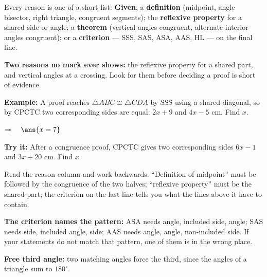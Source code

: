 \documentclass[12pt]{article}
\begin{document}


\begin{formulabox}
Every reason is one of a short list: \textbf{Given}; a \textbf{definition} (midpoint, angle bisector, right triangle, congruent segments); the \textbf{reflexive property} for a shared side or angle; a \textbf{theorem} (vertical angles congruent, alternate interior angles congruent); or a \textbf{criterion} --- SSS, SAS, ASA, AAS, HL --- on the final line.\par
\textbf{Two reasons no mark ever shows:} the reflexive property for a shared part, and vertical angles at a crossing. Look for them before deciding a proof is short of evidence.
\end{formulabox}

\begin{examplebox}
\textbf{Example:} \quad A proof reaches $\triangle ABC \cong \triangle CDA$ by SSS using a shared diagonal, so by CPCTC two corresponding sides are equal: $2x + 9$ and $4x - 5$ cm. Find $x$.

$\Rightarrow\quad \ans{x = 7}$
\end{examplebox}

\begin{tryitbox}
\textbf{Try it:} \quad After a congruence proof, CPCTC gives two corresponding sides $6x - 1$ and $3x + 20$ cm. Find $x$.\\[2pt]
\end{tryitbox}


\begin{formulabox}
Read the reason column and work backwards. ``Definition of midpoint'' must be followed by the congruence of the two halves; ``reflexive property'' must be the shared part; the criterion on the last line tells you what the lines above it have to contain.\par
\textbf{The criterion names the pattern:} ASA needs angle, included side, angle; SAS needs side, included angle, side; AAS needs angle, angle, non-included side. If your statements do not match that pattern, one of them is in the wrong place.\par
\textbf{Free third angle:} two matching angles force the third, since the angles of a triangle sum to $180^\circ$.
\end{formulabox}
\end{document}
